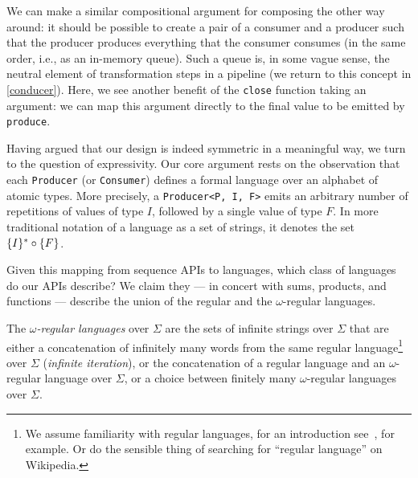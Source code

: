 \documentclass[sigplan,screen,10pt,review]{acmart}
\begin{document}
We can make a similar compositional argument for composing the other way around: it should be possible to create a pair of a consumer and a producer such that the producer produces everything that the consumer consumes (in the same order, i.e., as an in-memory queue). Such a queue is, in some vague sense, the neutral element of transformation steps in a pipeline (we return to this concept in \cref{conducer}). Here, we see another benefit of the \texttt{close} function taking an argument: we can map this argument directly to the final value to be emitted by \texttt{produce}.


Having argued that our design is indeed symmetric in a meaningful way, we turn to the question of expressivity. Our core argument rests on the observation that each \texttt{Producer} (or \texttt{Consumer}) defines a formal language over an alphabet of atomic types. More precisely, a \texttt{Producer<P, I, F>} emits an arbitrary number of repetitions of values of type $I$, followed by a single value of type $F$. In more traditional notation of a language as a set of strings, it denotes the set $\{I\}^{\ast} \circ \{F\}$.

Given this mapping from sequence APIs to languages, which class of languages do our APIs describe? We claim they --- in concert with sums, products, and functions --- describe the union of the regular and the $\omega$-regular languages.

The \textit{$\omega$-regular languages} over $\Sigma$ are the sets of infinite strings over $\Sigma$ that are either a concatenation of infinitely many words from the same regular language\footnote{We assume familiarity with regular languages, for an introduction see~\cite{hopcroft1969formal}, for example. Or do the sensible thing of searching for ``regular language'' on Wikipedia.} over $\Sigma$ (\textit{infinite iteration}), or the concatenation of a regular language and an $\omega$-regular language over $\Sigma$, or a choice between finitely many $\omega$-regular languages over $\Sigma$.
\end{document}
